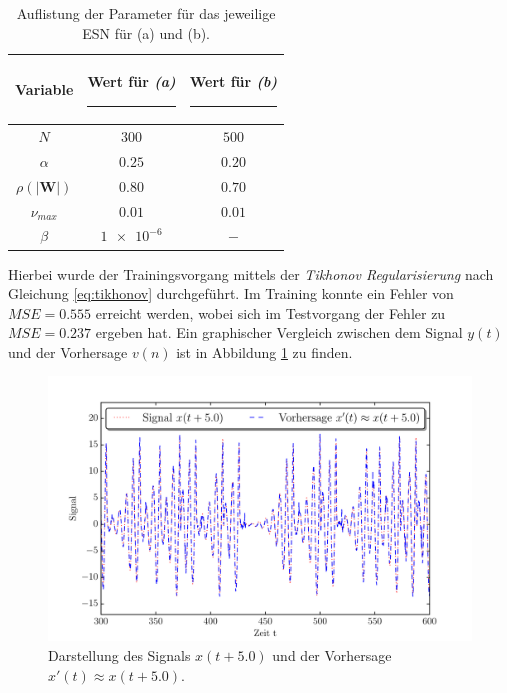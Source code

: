 \begin{table}[H]
	\centering
	\captionsetup{width=0.9\linewidth}
		\begin{tabular}{|c|c|c|}
		\rule[-1ex]{0pt}{3.5ex} Variable & \hspace{4ex} Wert für \textit{(a)} \rule[-1ex]{4ex}{0pt} & \hspace{4ex} Wert für \textit{(b)} \rule[-1ex]{4ex}{0pt}\\ 
		\hline \hline 
		\rule[-1ex]{0pt}{3.5ex} $N$ & $300$ & $500$ \\ 
		\hline 
		\rule[-1ex]{0pt}{3.5ex} $\alpha$ & $0.25$ & $0.20$ \\ 
		\hline 
		\rule[-1ex]{0pt}{3.5ex} $\rho(|\mathbf{W}|)$ & $0.80$ & $0.70$\\ 
		\hline 
		\rule[-1ex]{0pt}{3.5ex} $\nu_{max}$ & $0.01$ & $0.01$\\ 
		\hline 
		\rule[-1ex]{0pt}{3.5ex} $\beta$ & $\num{1e-6}$ & $-$\\ 
		\hline 
	\end{tabular} 
	\caption{Auflistung der Parameter für das jeweilige \textsc{ESN} für (a) und (b).}
	\label{tab:application_roessler}
\end{table}

Hierbei wurde der Trainingsvorgang mittels der \textit{Tikhonov Regularisierung} nach Gleichung \ref{eq:tikhonov} durchgeführt. Im Training konnte ein Fehler von $MSE = 0.555 	$ erreicht werden, wobei sich im Testvorgang der Fehler zu $MSE = 0.237$ ergeben hat. Ein graphischer Vergleich zwischen dem Signal $y(t)$ und der Vorhersage $v(n)$ ist in Abbildung \ref{fig:application_roessler_a} zu finden.

\vspace{-3.75ex}
\begin{figure}[H]
    \centering
    \includegraphics[width = 0.9 \textwidth]{figures/roessler_pred50.pdf}
    \caption{Darstellung des Signals $x(t+5.0)$ und der Vorhersage $x'(t) \approx x(t+5.0)$.}
    \label{fig:application_roessler_a}
\end{figure}




